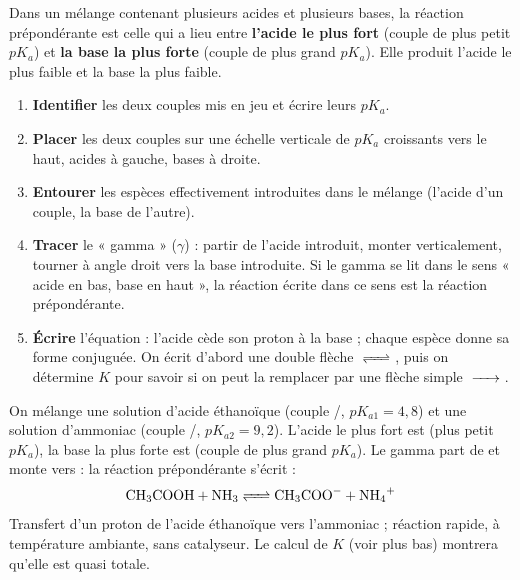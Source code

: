 \documentclass[11pt]{article}
\newcommand{\cle}[1]{{\popxbold\color{popdark}#1}}
\begin{document}
\begin{propriete}
Dans un mélange contenant plusieurs acides et plusieurs bases, la \cle{réaction prépondérante} est celle qui a lieu entre \textbf{l'acide le plus fort} (couple de plus petit $pK_a$) et \textbf{la base la plus forte} (couple de plus grand $pK_a$). Elle produit l'acide le plus faible et la base la plus faible.
\end{propriete}

\begin{methode}
\begin{enumerate}
\item \textbf{Identifier} les deux couples mis en jeu et écrire leurs $pK_a$.
\item \textbf{Placer} les deux couples sur une échelle verticale de $pK_a$ croissants vers le haut, acides à gauche, bases à droite.
\item \textbf{Entourer} les espèces effectivement introduites dans le mélange (l'acide d'un couple, la base de l'autre).
\item \textbf{Tracer} le « gamma » ($\gamma$) : partir de l'acide introduit, monter verticalement, tourner à angle droit vers la base introduite. Si le gamma se lit dans le sens « acide en bas, base en haut », la réaction écrite dans ce sens est la réaction prépondérante.
\item \textbf{Écrire} l'équation : l'acide cède son proton à la base ; chaque espèce donne sa forme conjuguée. On écrit d'abord une double flèche $\ce{<=>}$, puis on détermine $K$ pour savoir si on peut la remplacer par une flèche simple $\ce{->}$.
\end{enumerate}
\end{methode}

\begin{exemplebox}
On mélange une solution d'acide éthanoïque (couple /, $pK_{a1} = 4,8$) et une solution d'ammoniac (couple /, $pK_{a2} = 9,2$). L'acide le plus fort est  (plus petit $pK_a$), la base la plus forte est  (couple de plus grand $pK_a$). Le gamma part de  et monte vers  : la réaction prépondérante s'écrit :
\[ \ce{CH3COOH + NH3 <=> CH3COO- + NH4+} \]
Transfert d'un proton de l'acide éthanoïque vers l'ammoniac ; réaction rapide, à température ambiante, sans catalyseur. Le calcul de $K$ (voir plus bas) montrera qu'elle est quasi totale.
\end{exemplebox}
\end{document}
